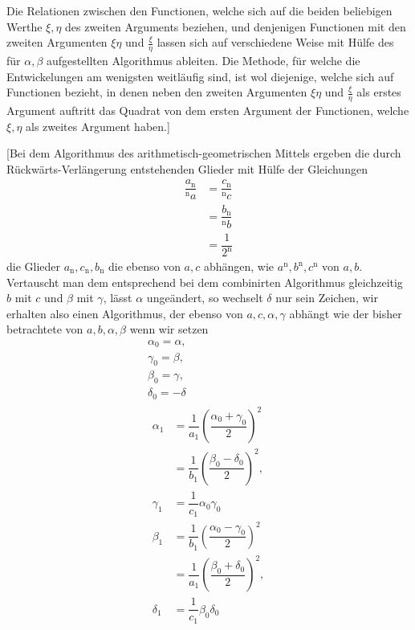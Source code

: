 Die Relationen zwischen den Functionen, welche sich auf die beiden beliebigen Werthe $\xi,\allowbreak \eta$ des zweiten Arguments beziehen, und denjenigen Functionen mit den zweiten Argumenten $\xi\eta$ und $\frac\xi\eta$ lassen sich auf verschiedene Weise mit
Hülfe des für $\alpha,\allowbreak \beta$ aufgestellten Algorithmus ableiten. Die Methode, für welche die Entwickelungen am wenigsten weitläufig sind, ist wol diejenige, welche sich auf Functionen bezieht, in denen neben den zweiten Argumenten $\xi\eta$ und $\frac{\xi}{\eta}$ als erstes Argument auftritt das Quadrat von dem ersten Argument der Functionen, welche $\xi,\allowbreak \eta$ als zweites Argument haben.]

[Bei dem Algorithmus des arithmetisch-geometrischen Mittels ergeben die durch Rückwärts-Verlängerung entstehenden Glieder mit Hülfe der Gleichungen
\[
\begin{aligned}\dfrac{a_{\mathrm n}}{{}^{\mathrm n}\!a}&=\dfrac{c_{\mathrm n}}{{}^{\mathrm n}\!c}\\[7pt]&=\dfrac{b_{\mathrm n}}{{}^{\mathrm n}\!b}\\[7pt]&=\dfrac{1}{2^{\mathrm n}}\end{aligned}
\]
die Glieder $a_{\mathrm n},\allowbreak c_{\mathrm n},\allowbreak b_{\mathrm n}$ die ebenso von $a,\allowbreak c$ abhängen, wie $a^{\mathrm n},\allowbreak b^{\mathrm n},\allowbreak c^{\mathrm n}$ von $a,\allowbreak b$. Vertauscht man dem entsprechend bei dem combinirten Algorithmus gleichzeitig $b$ mit $c$ und $\beta$ mit $\gamma$, lässt $\alpha$ ungeändert, so wechselt $\delta$ nur sein Zeichen, wir erhalten also einen Algorithmus, der ebenso von $a,\allowbreak c,\allowbreak \alpha,\allowbreak \gamma$ abhängt wie der bisher betrachtete von $a,\allowbreak b,\allowbreak \alpha,\allowbreak \beta$ wenn wir setzen
\[
\begin{gathered}
\alpha_0=\alpha,\\[7pt]\gamma_0=\beta,\\[7pt]\beta_0=\gamma,\\[7pt]\delta_0=-\delta\\[8pt]
\begin{aligned}
\alpha_1&=\dfrac{1}{a_1}\left(\dfrac{\alpha_0+\gamma_0}{2}\right)^2
\\[6pt]&=\dfrac{1}{b_1}\left(\dfrac{\beta_0-\delta_0}{2}\right)^2,
\\[7pt]\gamma_1&=\dfrac{1}{c_1}\alpha_0\gamma_0\\[8pt]
\beta_1&=\dfrac{1}{b_1}\left(\dfrac{\alpha_0-\gamma_0}{2}\right)^2
\\[6pt]&=\dfrac{1}{a_1}\left(\dfrac{\beta_0+\delta_0}{2}\right)^2,
\\[7pt]\delta_1&=\dfrac{1}{c_1}\beta_0\delta_0
\end{aligned}
\end{gathered}
\]
